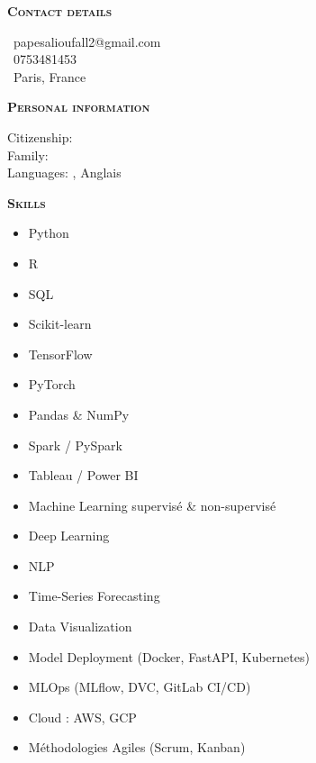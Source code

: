 \documentclass[11pt,a4paper]{article}
\newcommand{\headleft}[1]{\vspace*{3ex}\textsc{\textbf{#1}}\par%
    \vspace*{-1.5ex}\hrulefill\par\vspace*{0.7ex}}
\begin{document}
\begin{minipage}[t]{0.33\textwidth}
{\begin{minipage}[t][293mm][t]{0.82\textwidth}
\headleft{Contact details}\small
\MVAt\ {\small papesalioufall2@gmail.com} \\[0.4ex]
\Mobilefone\ 0753481453 \\[0.5ex]
\Letter\ Paris, France
\normalsize

\headleft{Personal information}
Citizenship:  \\[0.5ex]
Family:  \\[0.5ex]
Languages: , Anglais

\headleft{Skills}
\begin{itemize}

  \item Python

  \item R

  \item SQL

  \item Scikit-learn

  \item TensorFlow

  \item PyTorch

  \item Pandas & NumPy

  \item Spark / PySpark

  \item Tableau / Power BI

  \item Machine Learning supervisé & non-supervisé

  \item Deep Learning

  \item NLP

  \item Time-Series Forecasting

  \item Data Visualization

  \item Model Deployment (Docker, FastAPI, Kubernetes)

  \item MLOps (MLflow, DVC, GitLab CI/CD)

  \item Cloud : AWS, GCP

  \item Méthodologies Agiles (Scrum, Kanban)

\end{itemize}

\end{minipage}\textwidth
}
\end{minipage}
\end{document}
